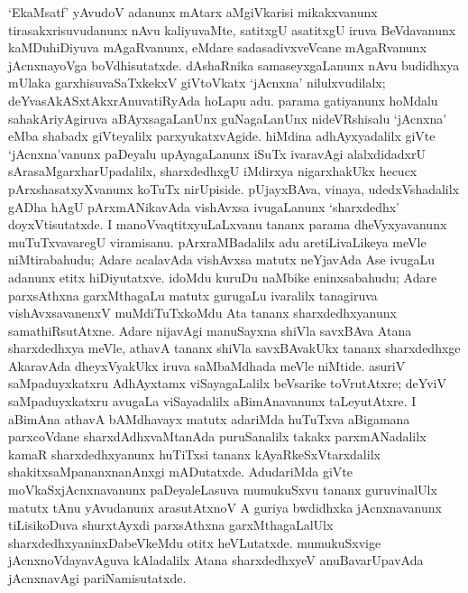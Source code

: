 `EkaMsatf' yAvudoV adanunx mAtarx aMgiVkarisi mikakxvanunx tirasakxrisuvudanunx nAvu kaliyuvaMte, satitxgU asatitxgU iruva BeVdavanunx kaMDuhiDiyuva mAgaRvanunx, eMdare sadasadivxveVcane mAgaRvanunx jAcnxnayoVga boVdhisutatxde. dAshaRnika samaseyxgaLanunx nAvu budidhxya mUlaka garxhisuvaSaTxkekxV giVtoVkatx `jAcnxna' nilulxvudilalx; deYvasAkASxtAkxrAnuvatiRyAda hoLapu adu. parama gatiyanunx hoMdalu sahakAriyAgiruva aBAyxsagaLanUnx guNagaLanUnx nideVRshisalu `jAcnxna' eMba shabadx giVteyalilx parxyukatxvAgide. hiMdina adhAyxyadalilx giVte `jAcnxna'vanunx paDeyalu upAyagaLanunx iSuTx ivaravAgi alalxdidadxrU sArasaMgarxharUpadalilx, sharxdedhxgU iMdirxya nigarxhakUkx hecucx pArxshasatxyXvanunx koTuTx nirUpiside. pUjayxBAva, vinaya, udedxVshadalilx gADha hAgU pArxmANikavAda vishAvxsa ivugaLanunx `sharxdedhx' doyxVtisutatxde. I manoVvaqtitxyuLaLxvanu tananx parama dheVyxyavanunx muTuTxvavaregU viramisanu. pArxraMBadalilx adu aretiLivaLikeya meVle niMtirabahudu; Adare acalavAda vishAvxsa matutx neYjavAda Ase ivugaLu adanunx etitx hiDiyutatxve. idoMdu kuruDu naMbike eninxsabahudu; Adare parxsAthxna garxMthagaLu matutx gurugaLu ivaralilx tanagiruva vishAvxsavanenxV muMdiTuTxkoMdu Ata tananx sharxdedhxyanunx samathiRsutAtxne. Adare nijavAgi manuSayxna shiVla savxBAva Atana sharxdedhxya meVle, athavA tananx shiVla savxBAvakUkx tananx sharxdedhxge AkaravAda dheyxVyakUkx iruva saMbaMdhada meVle niMtide. asuriV saMpaduyxkatxru AdhAyxtamx viSayagaLalilx beVsarike toVrutAtxre; deYviV saMpaduyxkatxru avugaLa viSayadalilx aBimAnavanunx taLeyutAtxre. I aBimAna athavA bAMdhavayx matutx adariMda huTuTxva aBigamana parxcoVdane sharxdAdhxvaMtanAda puruSanalilx takakx parxmANadalilx kamaR sharxdedhxyanunx huTiTxsi tananx kAyaRkeSxVtarxdalilx shakitxsaMpananxnanAnxgi mADutatxde. AdudariMda giVte moVkaSxjAcnxnavanunx paDeyaleLasuva mumukuSxvu tananx guruvinalUlx matutx tAnu yAvudanunx arasutAtxnoV A guriya bwdidhxka jAcnxnavanunx tiLisikoDuva shurxtAyxdi parxsAthxna garxMthagaLalUlx sharxdedhxyaninxDabeVkeMdu otitx heVLutatxde. mumukuSxvige jAcnxnoVdayavAguva kAladalilx Atana sharxdedhxyeV anuBavarUpavAda jAcnxnavAgi pariNamisutatxde.

